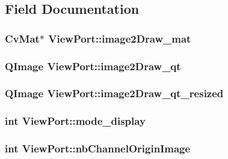 \subsection{Field Documentation}
\hypertarget{classViewPort_af6a3576406241b379379cc6d1a6d0c4f}{
\subsubsection[{image2Draw\_\-mat}]{\setlength{\rightskip}{0pt plus 5cm}CvMat$\ast$ {\bf ViewPort::image2Draw\_\-mat}}}
\label{classViewPort_af6a3576406241b379379cc6d1a6d0c4f}
\hypertarget{classViewPort_affb4d66105d8c57b62a8d1ca3a2f2aae}{
\subsubsection[{image2Draw\_\-qt}]{\setlength{\rightskip}{0pt plus 5cm}QImage {\bf ViewPort::image2Draw\_\-qt}}}
\label{classViewPort_affb4d66105d8c57b62a8d1ca3a2f2aae}
\hypertarget{classViewPort_a69c446903d67c1e328c8398341c2da21}{
\subsubsection[{image2Draw\_\-qt\_\-resized}]{\setlength{\rightskip}{0pt plus 5cm}QImage {\bf ViewPort::image2Draw\_\-qt\_\-resized}}}
\label{classViewPort_a69c446903d67c1e328c8398341c2da21}
\hypertarget{classViewPort_abdd3f74adf3deb4bc1808f669d8815a4}{
\subsubsection[{mode\_\-display}]{\setlength{\rightskip}{0pt plus 5cm}int {\bf ViewPort::mode\_\-display}}}
\label{classViewPort_abdd3f74adf3deb4bc1808f669d8815a4}
\hypertarget{classViewPort_a023381fa2838df1c3ef3a9183f4abbd1}{
\subsubsection[{nbChannelOriginImage}]{\setlength{\rightskip}{0pt plus 5cm}int {\bf ViewPort::nbChannelOriginImage}}}
